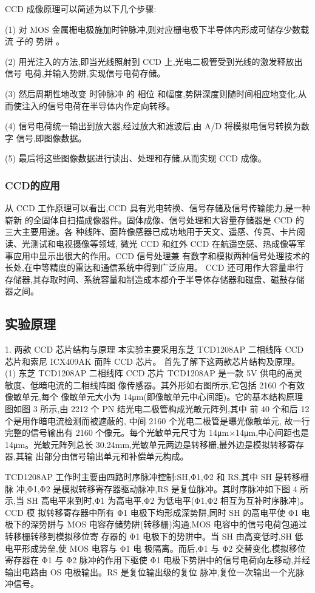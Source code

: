 \documentclass{ctexart}
\begin{document}
CCD 成像原理可以简述为以下几个步骤:

(1) 对 MOS 金属栅电极施加时钟脉冲,则对应栅电极下半导体内形成可储存少数载流
子的 势阱 。

(2) 用光注入的方法,即当光线照射到 CCD 上,光电二极管受到光线的激发释放出信号
电荷,并输入势阱,实现信号电荷存储。

(3) 然后周期性地改变 时钟脉冲 的 相位 和幅度,势阱深度则随时间相应地变化,从而使注入的信号电荷在半导体内作定向转移。

(4) 信号电荷统一输出到放大器,经过放大和滤波后,由 A/D 将模拟电信号转换为数字
信号,即图像数据。

(5) 最后将这些图像数据进行读出、处理和存储,从而实现 CCD 成像。

\subsubsection{CCD的应用}
从 CCD 工作原理可以看出,CCD 具有光电转换、信号存储及信号传输能力,是一种崭新
的全固体自扫描成像器件。固体成像、信号处理和大容量存储器是 CCD 的三大主要用途。各
种线阵、面阵像感器已成功地用于天文、遥感、传真、卡片阅读、光测试和电视摄像等领域,
微光 CCD 和红外 CCD 在航遥空感、热成像等军事应用中显示出很大的作用。CCD 信号处理兼
有数字和模拟两种信号处理技术的长处,在中等精度的雷达和通信系统中得到广泛应用。
CCD 还可用作大容量串行存储器,其存取时间、系统容量和制造成本都介于半导体存储器和磁盘、磁鼓存储器之间。
\subsection{实验原理}
1. 两款 CCD 芯片结构与原理
本实验主要采用东芝 TCD1208AP 二相线阵 CCD 芯片和索尼 ICX409AK 面阵 CCD 芯片。
首先了解下这两款芯片结构及原理。
(1) 东芝 TCD1208AP 二相线阵 CCD 芯片
TCD1208AP 是一款 5V 供电的高灵敏度、低暗电流的二相线阵图
像传感器。其外形如右图所示,它包括 2160 个有效像敏单元,每个
像敏单元大小为 14μm(即像敏单元中心间距)。它的基本结构原理
图如图 3 所示,由 2212 个 PN 结光电二极管构成光敏元阵列,其中
前 40 个和后 12 个是用作暗电流检测而被遮蔽的,
中间 2160 个光电二极管是曝光像敏单元,
故一行完整的信号输出有 2160 个像元。每个光敏单元尺寸为 14μm×14μm,中心间距也是
14μm。光敏元阵列总长 30.24mm,光敏单元两边是转移栅,最外边是模拟转移寄存器,其输
出部分由信号输出单元和补偿单元构成。

TCD1208AP 工作时主要由四路时序脉冲控制:SH,Φ1,Φ2 和 RS,其中 SH 是转移栅脉
冲,Φ1,Φ2 是模拟转移寄存器驱动脉冲,RS 是复位脉冲。其时序脉冲如下图 4 所示,当
SH 高电平来到时,Φ1 为高电平,Φ2 为低电平(Φ1,Φ2 相互为互补时序脉冲)。CCD 模
拟转移寄存器中所有 Φ1 电极下均形成深势阱,同时 SH 的高电平使 Φ1 电极下的深势阱与
MOS 电容存储势阱(转移栅)沟通,MOS 电容中的信号电荷包通过转移栅转移到模拟移位寄
存器的 Φ1 电极下的势阱中。当 SH 由高变低时,SH 低电平形成势垒,使 MOS 电容与 Φ1 电
极隔离。而后,Φ1 与 Φ2 交替变化,模拟移位寄存器在 Φ1 与 Φ2 脉冲的作用下驱使 Φ1
电极下势阱中的信号电荷向左移动,并经输出电路由 OS 电极输出。RS 是复位输出级的复位
脉冲,复位一次输出一个光脉冲信号。
\end{document}
